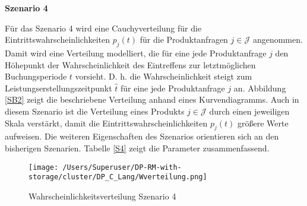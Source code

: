 \textbf{Szenario 4}

Für das Szenario 4 wird eine Cauchyverteilung für die Eintrittswahrscheinlichkeiten $p_j(t)$ für die Produktanfragen $j\in\mathcal{J}$ angenommen. Damit wird eine Verteilung modelliert, die für eine jede Produktanfrage $j$ den Höhepunkt der Wahrscheinlichkeit des Eintreffens zur letztmöglichen Buchungsperiode $t$ vorsieht. D. h. die Wahrscheinlichkeit steigt zum Leistungserstellungszeitpunkt $\hat t$ für eine jede Produktanfrage $j$ an. Abbildung \ref{SB2} zeigt die beschriebene Verteilung anhand eines Kurvendiagramms. Auch in diesem Szenario ist die Verteilung eines Produkts $j\in\mathcal{J}$ durch einen jeweiligen Skala verstärkt, damit die Eintrittswahrscheinlichkeiten $p_j(t)$ größere Werte aufweisen. Die weiteren Eigenschaften des Szenarios orientieren sich an den bisherigen Szenarien. Tabelle \ref{S4} zeigt die Parameter  zusammenfassend.

\begin{figure}[h!]
  \begin{center}
    \texttt{[image: /Users/Superuser/DP-RM-with-storage/cluster/DP\_C\_Lang/Wverteilung.png]}
    \caption{Wahrscheinlichkeitsverteilung Szenario 4}  \label{SB4}
  \end{center}
\end{figure}

